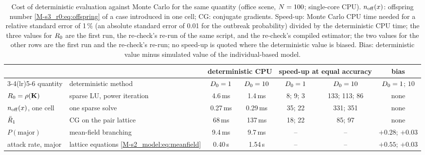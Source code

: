 \begin{table}[tbp]
  \centering\footnotesize\setlength{\tabcolsep}{4pt}
  \caption{Cost of deterministic evaluation against Monte Carlo for the same quantity (office scene,
  $N=100$; single-core CPU). $n_{\mathrm{off}}(x)$: offspring number \eqref{M-s3_r0:eq:offspring} of a case introduced in one
  cell; CG: conjugate gradients. Speed-up: Monte Carlo CPU time needed for a relative standard error of 1\,\%
  (an absolute standard error of 0.01 for the outbreak probability) divided by the deterministic CPU time; the
  three values for $R_0$ are the first run, the re-check's re-run of the same script, and the
  re-check's compiled estimator; the two values for the other rows are the first run and the re-check's
  re-run; no speed-up is quoted where the deterministic value is biased. Bias: deterministic value minus
  simulated value of the individual-based model.}
  \label{s7_interventions:tab:cost}
  \begin{tabular}{@{}llccccc@{}}
    \toprule
     & & \multicolumn{2}{c}{deterministic CPU} & \multicolumn{2}{c}{speed-up at equal accuracy} & bias \\
    \cmidrule(lr){3-4}\cmidrule(lr){5-6}
    quantity & deterministic method & $D_0=1$ & $D_0=10$ & $D_0=1$ & $D_0=10$ & $D_0=1$; $10$ \\
    \midrule
    $R_0=\rho(\mathbf{K})$ & sparse LU, power iteration & 4.6\,ms & 1.4\,ms & 8; 9; 3 & 133; 113; 86 & none \\
    $n_{\mathrm{off}}(x)$, one cell & one sparse solve & 0.27\,ms & 0.29\,ms & 35; 22 & 331; 351 & none \\
    $\bar{R}_1$ & CG on the pair lattice & 68\,ms & 137\,ms & 18; 22 & 85; 97 & none \\
    $P(\text{major})$ & mean-field branching & 9.4\,ms & 9.7\,ms & -- & -- & $+0.28$; $+0.03$ \\
    attack rate, major & lattice equations \eqref{M-s2_model:eq:meanfield} & 0.40\,s & 1.54\,s & -- & -- & $+0.55$; $+0.03$ \\
    \bottomrule
  \end{tabular}
\end{table}
